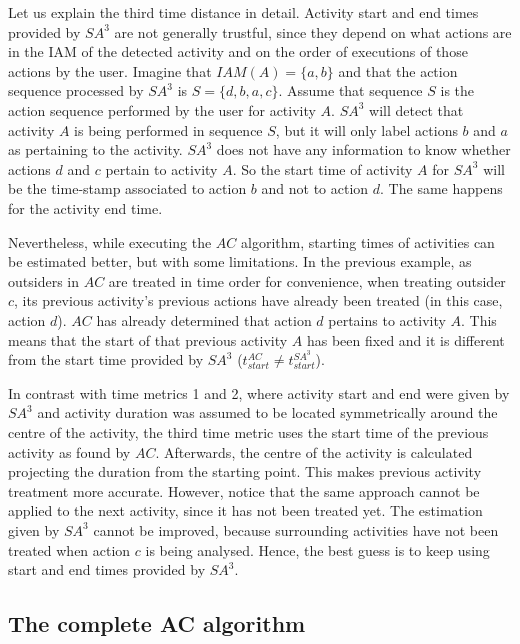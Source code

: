 Let us explain the third time distance in detail. Activity start and end times provided by $SA^3$ are not generally trustful, since they depend on what actions are in the IAM of the detected activity and on the order of executions of those actions by the user. Imagine that $IAM(A)=\{a, b\}$ and that the action sequence processed by $SA^3$ is $S=\{d, b, a, c\}$. Assume that sequence $S$ is the action sequence performed by the user for activity $A$. $SA^3$ will detect that activity $A$ is being performed in sequence $S$, but it will only label actions $b$ and $a$ as pertaining to the activity. $SA^3$ does not have any information to know whether actions $d$ and $c$ pertain to activity $A$. So the start time of activity $A$ for $SA^3$ will be the time-stamp associated to action $b$ and not to action $d$. The same happens for the activity end time.

Nevertheless, while executing the $AC$ algorithm, starting times of activities can be estimated better, but with some limitations. In the previous example, as outsiders in $AC$ are treated in time order for convenience, when treating outsider $c$, its previous activity's previous actions have already been treated (in this case, action $d$). $AC$ has already determined that action $d$ pertains to activity $A$. This means that the start of that previous activity $A$ has been fixed and it is different from the start time provided by $SA^3$ ($t_{start} ^{AC} \neq t_{start} ^{SA^3}$).

In contrast with time metrics 1 and 2, where activity start and end were given by $SA^3$ and activity duration was assumed to be located symmetrically around the centre of the activity, the third time metric uses the start time of the previous activity as found by $AC$. Afterwards, the centre of the activity is calculated projecting the duration from the starting point. This makes previous activity treatment more accurate. However, notice that the same approach cannot be applied to the next activity, since it has not been treated yet. The estimation given by $SA^3$ cannot be improved, because surrounding activities have not been treated when action $c$ is being analysed. Hence, the best guess is to keep using start and end times provided by $SA^3$.

\subsection{The complete AC algorithm}
\label{subsec:clustering:complete-ac}

